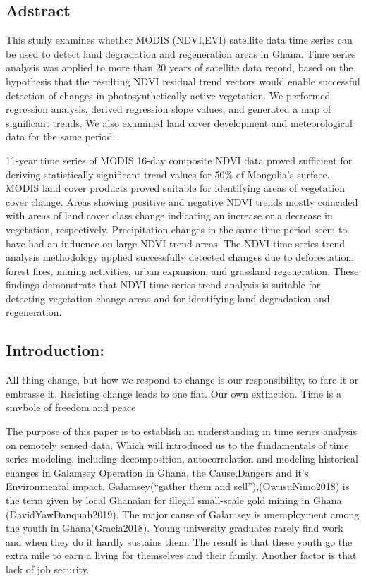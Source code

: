 \documentclass[
]{report}
\begin{document}
\hypertarget{adstract}{%
\subsection{Adstract}\label{adstract}}

This study examines whether MODIS (NDVI,EVI) satellite data time series
can be used to detect land degradation and regeneration areas in Ghana.
Time series analysis was applied to more than 20 years of satellite data
record, based on the hypothesis that the resulting NDVI residual trend
vectors would enable successful detection of changes in
photosynthetically active vegetation. We performed regression analysis,
derived regression slope values, and generated a map of significant
trends. We also examined land cover development and meteorological data
for the same period.

11-year time series of MODIS 16-day composite NDVI data proved
sufficient for deriving statistically significant trend values for 50\%
of Mongolia's surface. MODIS land cover products proved suitable for
identifying areas of vegetation cover change. Areas showing positive and
negative NDVI trends mostly coincided with areas of land cover class
change indicating an increase or a decrease in vegetation, respectively.
Precipitation changes in the same time period seem to have had an
influence on large NDVI trend areas. The NDVI time series trend analysis
methodology applied successfully detected changes due to deforestation,
forest fires, mining activities, urban expansion, and grassland
regeneration. These findings demonstrate that NDVI time series trend
analysis is suitable for detecting vegetation change areas and for
identifying land degradation and regeneration.

\hypertarget{introduction}{%
\subsection{Introduction:}\label{introduction}}

All thing change, but how we respond to change is our responsibility, to
fare it or embrasse it. Resisting change leads to one fiat. Our own
extinction. Time is a smybole of freedom and peace

The purpose of this paper is to establish an understanding in time
series analysis on remotely sensed data. Which will introduced us to the
fundamentals of time series modeling, including decomposition,
autocorrelation and modeling historical changes in Galamsey Operation in
Ghana, the Cause,Dangers and it's Environmental impact.
Galamsey(``gather them and sell''),(OwusuNimo2018) is the term given by
local Ghanaian for illegal small-scale gold mining in Ghana
(DavidYawDanquah2019). The major cause of Galamsey is unemployment among
the youth in Ghana(Gracia2018). Young university graduates rarely find
work and when they do it hardly sustains them. The result is that these
youth go the extra mile to earn a living for themselves and their
family. Another factor is that lack of job security.
\end{document}
